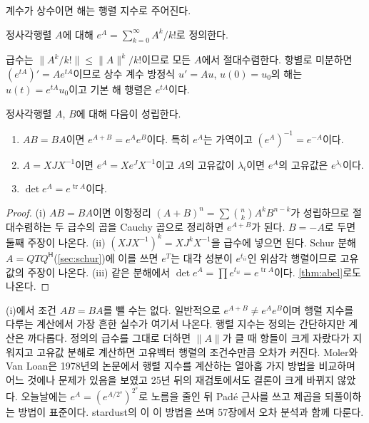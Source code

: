 계수가 상수이면 해는 행렬 지수로 주어진다.

\begin{definition}[행렬 지수]
\label{def:expm}
정사각행렬 $A$에 대해 $e^A=\sum_{k=0}^\infty A^k/k!$로 정의한다.
\end{definition}

급수는 $\|A^k/k!\|\le\|A\|^k/k!$이므로 모든 $A$에서 절대수렴한다. 항별로 미분하면 $(e^{tA})'=Ae^{tA}$이므로 상수 계수 방정식 $u'=Au$, $u(0)=u_0$의 해는 $u(t)=e^{tA}u_0$이고 기본 해 행렬은 $e^{tA}$이다.

\begin{proposition}
\label{prop:expm}
정사각행렬 $A$, $B$에 대해 다음이 성립한다.
\begin{enumerate}
\item $AB=BA$이면 $e^{A+B}=e^Ae^B$이다. 특히 $e^A$는 가역이고 $(e^A)^{-1}=e^{-A}$이다.
\item $A=XJX^{-1}$이면 $e^A=Xe^JX^{-1}$이고 $A$의 고유값이 $\lambda_i$이면 $e^A$의 고유값은 $e^{\lambda_i}$이다.
\item $\det e^A=e^{\operatorname{tr}A}$이다.
\end{enumerate}
\end{proposition}

\begin{proof}
(i) $AB=BA$이면 이항정리 $(A+B)^n=\sum\binom nkA^kB^{n-k}$가 성립하므로 절대수렴하는 두 급수의 곱을 Cauchy 곱으로 정리하면 $e^{A+B}$가 된다. $B=-A$로 두면 둘째 주장이 나온다. (ii) $(XJX^{-1})^k=XJ^kX^{-1}$을 급수에 넣으면 된다. Schur 분해 $A=QTQ^{\mathsf H}$(\cref{sec:schur})에 이를 쓰면 $e^T$는 대각 성분이 $e^{t_{ii}}$인 위삼각 행렬이므로 고유값의 주장이 나온다. (iii) 같은 분해에서 $\det e^A=\prod e^{t_{ii}}=e^{\operatorname{tr}A}$이다. \cref{thm:abel}로도 나온다.
\end{proof}

(i)에서 조건 $AB=BA$를 뺄 수는 없다. 일반적으로 $e^{A+B}\ne e^Ae^B$이며 행렬 지수를 다루는 계산에서 가장 흔한 실수가 여기서 나온다. 행렬 지수는 정의는 간단하지만 계산은 까다롭다. 정의의 급수를 그대로 더하면 $\|A\|$가 클 때 항들이 크게 자랐다가 지워지고 고유값 분해로 계산하면 고유벡터 행렬의 조건수만큼 오차가 커진다. Moler와 Van Loan은 1978년의 논문에서 행렬 지수를 계산하는 열아홉 가지 방법을 비교하며 어느 것에나 문제가 있음을 보였고 25년 뒤의 재검토에서도 결론이 크게 바뀌지 않았다\cite{moler2003nineteen}. 오늘날에는 $e^A=(e^{A/2^s})^{2^s}$로 노름을 줄인 뒤 Padé 근사를 쓰고 제곱을 되풀이하는 방법이 표준이다. stardust의 이 이 방법을 쓰며 57장에서 오차 분석과 함께 다룬다.

